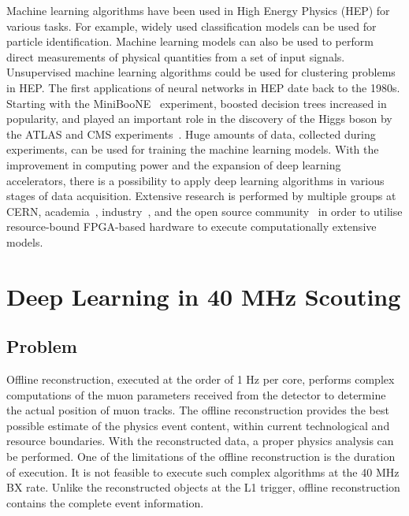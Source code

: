 \documentclass[10pt, paper=a4, UKenglish]{article}
\begin{document}
Machine learning algorithms have been used in High Energy Physics (HEP) for various tasks. For example, widely used classification models can be used for particle identification. Machine learning models can also be used to perform direct measurements of physical quantities from a set of input signals. Unsupervised machine learning algorithms could be used for clustering problems in HEP. The first applications of neural networks in HEP date back to the 1980s. Starting with the MiniBooNE~\cite{miniboone} experiment, boosted decision trees increased in popularity, and played an important role in the discovery of the Higgs boson by the ATLAS and CMS experiments~\cite{aradovic}. Huge amounts of data, collected during experiments, can be used for training the machine learning models. With the improvement in computing power and the expansion of deep learning accelerators, there is a possibility to apply deep learning algorithms in various stages of data acquisition. Extensive research is performed by multiple groups at CERN, academia~\cite{hls4ml}, industry~\cite{ibm_low_inf}, and the open source community~\cite{qkeras} in order to utilise resource-bound FPGA-based hardware to execute computationally extensive models.


\section{Deep Learning in 40 MHz Scouting}
\label{Deep Learning in 40 MHz Scouting}

\subsection{Problem}
Offline reconstruction, executed at the order of 1 Hz per core, performs complex computations of the muon parameters received from the detector to determine the actual position of muon tracks. The offline reconstruction provides the best possible estimate of the physics event content, within current technological and resource boundaries. With the reconstructed data, a proper physics analysis can be performed. One of the limitations of the offline reconstruction is the duration of execution. It is not feasible to execute such complex algorithms at the 40 MHz BX rate. Unlike the reconstructed objects at the L1 trigger, offline reconstruction contains the complete event information.
\end{document}
